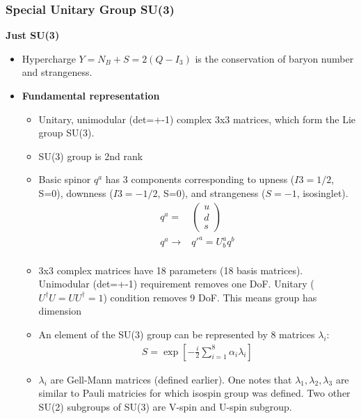 \subsubsection{Special Unitary Group SU(3)}
{\color{red}\textbf{Just SU(3)}}
\begin{itemize}
    \item Hypercharge $Y=N_B+S=2(Q-I_3)$ is the conservation of baryon number and strangeness. \cite{hokim}
    \item \textbf{Fundamental representation} \cite{hokim}
    \begin{itemize}
        \item Unitary, unimodular (det=+-1) complex 3x3 matrices, which form the Lie group SU(3). \cite{hokim}
        \item SU(3) group is 2nd rank \cite{hokim}
        \item Basic spinor $q^a$ has 3 components corresponding to upness ($I3=1/2$, S=0), downness ($I3=-1/2$, S=0), and strangeness ($S=-1$, isosinglet). \cite{hokim}
        \begin{equation}\begin{split}
        q^a=&\begin{pmatrix}u\\d\\s\end{pmatrix} \\
        q^a\to&q'^a=U^a_bq^b \\
        \end{split}\end{equation}
        \item 3x3 complex matrices have 18 parameters (18 basis matrices). Unimodular (det=+-1) requirement removes one DoF. Unitary ($U^\dagger U=UU^\dagger=1$) condition removes 9 DoF. This means group has dimension  \cite{hokim}
        \item An element of the SU(3) group can be represented by 8 matrices $\lambda_i$: \cite{hokim}
        \begin{equation}\begin{split}
            S=\exp\left[-\frac{i}{2}\sum_{i=1}^8\alpha_i\lambda_i\right]
        \end{split}\end{equation}
        \item $\lambda_i$ are Gell-Mann matrices (defined earlier). One notes that $\lambda_1,\lambda_2,\lambda_3$ are similar to Pauli matricies for which isospin group was defined. Two other SU(2) subgroups of SU(3) are V-spin and U-spin subgroup. \cite{hokim}

\end{itemize}
\end{itemize}
